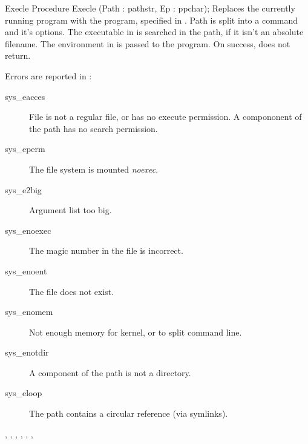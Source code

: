 \begin{procedure}{Execle}
\Declaration
Procedure Execle (Path : pathstr, Ep : ppchar);
\Description
Replaces the currently running program with the program, specified in
. Path is split into a command and it's options.
The executable in  is searched in the path, if it isn't
an absolute filename.
The environment in  is passed to the program.
On success,  does not return.

\Errors
Errors are reported in :
\begin{description}
\item[sys\_eacces] File is not a regular file, or has no execute permission.
A compononent of the path has no search permission.
\item[sys\_eperm] The file system is mounted \textit{noexec}.
\item[sys\_e2big] Argument list too big.
\item[sys\_enoexec] The magic number in the file is incorrect.
\item[sys\_enoent] The file does not exist.
\item[sys\_enomem] Not enough memory for kernel, or to split command line.
\item[sys\_enotdir] A component of the path is not a directory.
\item[sys\_eloop] The path contains a circular reference (via symlinks).
\end{description}
\SeeAlso
{}, , ,
, , ,  
\end{procedure}


